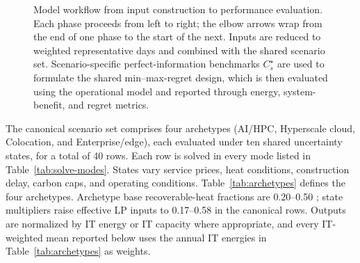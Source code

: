 \documentclass[preprint,12pt]{elsarticle}
\begin{document}
\begin{figure}[tbp]

\caption{Model workflow from input construction to performance evaluation. Each
phase proceeds from left to right; the elbow arrows wrap from the end of one phase to the
start of the next. Inputs are reduced to weighted representative days and combined
with the shared scenario set. Scenario-specific perfect-information benchmarks
$C_s^{\star}$ are used to formulate the shared min--max-regret design, which is then
evaluated using the operational model and reported through energy, system-benefit,
and regret metrics.}
\label{fig:model-pipeline}

\end{figure}

The canonical scenario set comprises four archetypes (AI/HPC, Hyperscale cloud, Colocation, and Enterprise/edge), each evaluated under ten shared uncertainty states, for a total of 40 rows. Each row is solved in every mode listed in Table~\ref{tab:solve-modes}. States vary service prices, heat conditions, construction delay, carbon caps, and operating conditions. Table~\ref{tab:archetypes} defines the four archetypes. Archetype base recoverable-heat fractions are 0.20--0.50 \cite{11,Hao2025}; state multipliers raise effective LP inputs to 0.17--0.58 in the canonical rows. Outputs are normalized by IT energy or IT capacity where appropriate, and every IT-weighted mean reported below uses the annual IT energies in Table~\ref{tab:archetypes} as weights.
\end{document}
